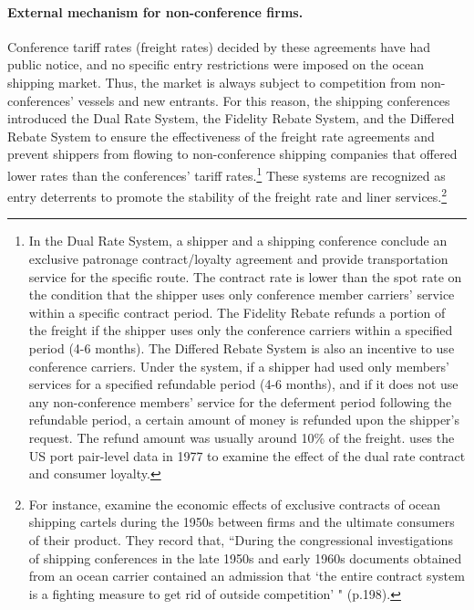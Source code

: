 \documentclass[11pt]{article}
\begin{document}
\paragraph{External mechanism for non-conference firms.}
Conference tariff rates (freight rates) decided by these agreements have had public notice, and no specific entry restrictions were imposed on the ocean shipping market. Thus, the market is always subject to competition from non-conferences' vessels and new entrants. For this reason, the shipping conferences introduced the Dual Rate System, the Fidelity Rebate System, and the Differed Rebate System to ensure the effectiveness of the freight rate agreements and prevent shippers from flowing to non-conference shipping companies that offered lower rates than the conferences' tariff rates.\footnote{In the Dual Rate System, a shipper and a shipping conference conclude an exclusive patronage contract/loyalty agreement and provide transportation service for the specific route. The contract rate is lower than the spot rate on the condition that the shipper uses only conference member carriers' service within a specific contract period. The Fidelity Rebate refunds a portion of the freight if the shipper uses only the conference carriers within a specified period (4-6 months). The Differed Rebate System is also an incentive to use conference carriers. Under the system, if a shipper had used only members' services for a specified refundable period (4-6 months), and if it does not use any non-conference members' service for the deferment period following the refundable period, a certain amount of money is refunded upon the shipper's request. The refund amount was usually around 10\% of the freight. \cite{fox1992empirical} uses the US port pair-level data in 1977 to examine the effect of the dual rate contract and consumer loyalty.} These systems are recognized as entry deterrents to promote the stability of the freight rate and liner services.\footnote{For instance, \cite{marin2003exclusive} examine the economic effects of exclusive contracts of ocean shipping cartels during the 1950s between firms and the ultimate consumers of their product. They record that, ``During the congressional investigations of shipping conferences in the late 1950s and early 1960s documents obtained from an ocean carrier contained an admission that ‘the entire contract system is a fighting measure to get rid of outside competition' " (p.198).}

\end{document}
